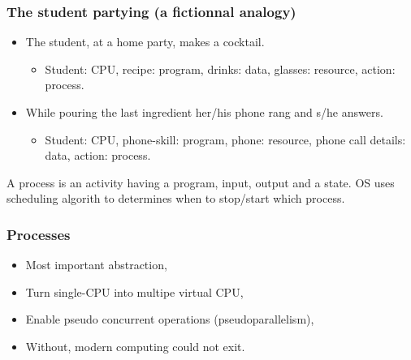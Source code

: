   \begin{frame}
    \frametitle{The student partying (a fictionnal analogy)}
        \begin{itemize}
          \item The student, at a home party, makes a cocktail.
          \begin{itemize}
            \item Student: CPU, recipe: program, drinks: data, glasses: resource, action: process.
          \end{itemize}
          \item While pouring the last ingredient her/his phone rang and s/he answers.
          \begin{itemize}
            \item Student: CPU, phone-skill: program, phone: resource, phone call details: data, action: process.
          \end{itemize}
        \end{itemize}
	A process is an activity having a program, input, output and a state. OS uses scheduling algorith to determines when to stop/start which process.
  \end{frame}

  \begin{frame}
    \frametitle{Processes}
        \begin{itemize}
          \item Most important abstraction,
          \item Turn single-CPU into multipe virtual CPU,
          \item Enable pseudo concurrent operations (pseudoparallelism),
          \item Without, modern computing could not exit.
        \end{itemize}
  \end{frame}

